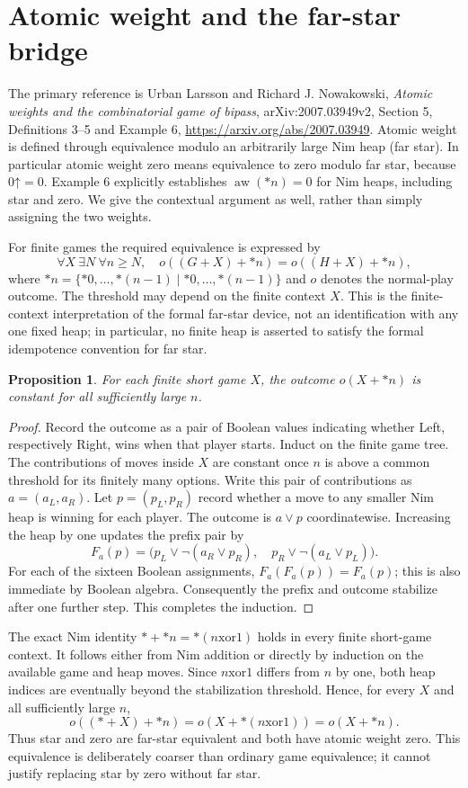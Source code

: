 \documentclass[11pt]{article}
\newtheorem{proposition}{Proposition}
\begin{document}
\section{Atomic weight and the far-star bridge}
The primary reference is Urban Larsson and Richard J. Nowakowski, \emph{Atomic weights and the combinatorial game of bipass}, arXiv:2007.03949v2, Section 5, Definitions 3--5 and Example 6, \url{https://arxiv.org/abs/2007.03949}. Atomic weight is defined through equivalence modulo an arbitrarily large Nim heap (far star). In particular atomic weight zero means equivalence to zero modulo far star, because $0\mathord\uparrow=0$. Example 6 explicitly establishes $\operatorname{aw}(*n)=0$ for Nim heaps, including star and zero. We give the contextual argument as well, rather than simply assigning the two weights.

For finite games the required equivalence is expressed by
\[
 \forall X\ \exists N\ \forall n\ge N,\quad
 o((G+X)+*n)=o((H+X)+*n),
\]
where $*n=\{*0,\ldots,*(n-1)\mid *0,\ldots,*(n-1)\}$ and $o$ denotes the normal-play outcome. The threshold may depend on the finite context $X$. This is the finite-context interpretation of the formal far-star device, not an identification with any one fixed heap; in particular, no finite heap is asserted to satisfy the formal idempotence convention for far star.

\begin{proposition}
For each finite short game $X$, the outcome $o(X+*n)$ is constant for all sufficiently large $n$.
\end{proposition}
\begin{proof}
Record the outcome as a pair of Boolean values indicating whether Left, respectively Right, wins when that player starts. Induct on the finite game tree. The contributions of moves inside $X$ are constant once $n$ is above a common threshold for its finitely many options. Write this pair of contributions as $a=(a_L,a_R)$. Let $p=(p_L,p_R)$ record whether a move to any smaller Nim heap is winning for each player. The outcome is $a\lor p$ coordinatewise. Increasing the heap by one updates the prefix pair by
\[
 F_a(p)=\bigl(p_L\lor\neg(a_R\lor p_R),\quad
                 p_R\lor\neg(a_L\lor p_L)\bigr).
\]
For each of the sixteen Boolean assignments, $F_a(F_a(p))=F_a(p)$; this is also immediate by Boolean algebra. Consequently the prefix and outcome stabilize after one further step. This completes the induction.
\end{proof}

The exact Nim identity $*+*n=*(n\mathbin{\mathrm{xor}}1)$ holds in every finite short-game context. It follows either from Nim addition or directly by induction on the available game and heap moves. Since $n\mathbin{\mathrm{xor}}1$ differs from $n$ by one, both heap indices are eventually beyond the stabilization threshold. Hence, for every $X$ and all sufficiently large $n$,
\[
 o((*+X)+*n)=o(X+*(n\mathbin{\mathrm{xor}}1))=o(X+*n).
\]
Thus star and zero are far-star equivalent and both have atomic weight zero. This equivalence is deliberately coarser than ordinary game equivalence; it cannot justify replacing star by zero without far star.
\end{document}
